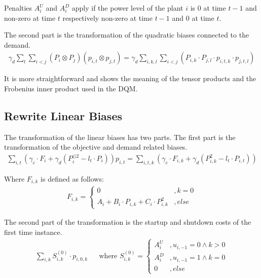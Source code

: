 Penalties $A_i^U$ and $A_i^D$ apply if the power level of the plant $i$ is $0$ at time $t-1$ and non-zero at time $t$ respectively non-zero at time $t-1$ and $0$ at time $t$.

The second part is the transformation of the quadratic biases connected to the demand.
\begin{align}
  \gamma_d \sum_t \sum_{i < j} \left( P_i \otimes P_j \right) \left( p_{i, t} \otimes p_{j, t} \right)
  = \gamma_d \sum_{i, k, l} \sum_{i < j} \left( P_{i,k} \cdot P_{j,l} \cdot p_{i, t, k} \cdot p_{j, t, l} \right)
\end{align}

It is more straightforward and shows the meaning of the tensor products and the Frobenius inner product used in the DQM.

\subsection{Rewrite Linear Biases}

The transformation of the linear biases has two parts.
The first part is the transformation of the objective and demand related biases.
\begin{align}
  \sum_{i, t} \left(
    \gamma_c \cdot F_i + \gamma_d \left( P_i^{\odot 2} - l_t \cdot P_i \right)
  \right) p_{i, t}
  =
  \sum_{i, t, k} \left(
    \gamma_c \cdot F_{i, k} + \gamma_d \left( P_{i, k}^2 - l_t \cdot P_{i, t} \right)
  \right)
\end{align}

Where $F_{i, k}$ is defined as follows:
\begin{align}
  F_{i, k} = \begin{cases}
    0 & , k = 0 \\
    A_i + B_i \cdot P_{i, k} + C_i \cdot P_{i, k}^2 & , else
  \end{cases}
\end{align}

The second part of the transformation is the startup and shutdown costs of the first time instance.
\begin{align}
  \sum_{i, k} S_{i, k}^{(0)} \cdot p_{i, 0, k}
  & & \text{where }
  S_{i, k}^{(0)} = \begin{cases}
    A_i^U & , u_{i, -1} = 0 \land k > 0 \\
    A_i^D & , u_{i, -1} = 1 \land k = 0 \\
    0 & , else
  \end{cases}
\end{align}

